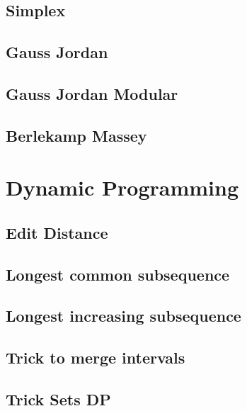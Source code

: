 \subsection{Simplex}
\raggedbottom
\hrulefill
\subsection{Gauss Jordan}
\raggedbottom
\hrulefill
\subsection{Gauss Jordan Modular}
\raggedbottom
\hrulefill
\subsection{Berlekamp Massey}
\raggedbottom
\hrulefill

\section{Dynamic Programming}
\subsection{Edit Distance}
\raggedbottom
\hrulefill
\subsection{Longest common subsequence}
\raggedbottom
\hrulefill
\subsection{Longest increasing subsequence}
\raggedbottom
\hrulefill
\subsection{Trick to merge intervals}
\raggedbottom
\hrulefill
\subsection{Trick Sets DP}
\raggedbottom
\hrulefill
